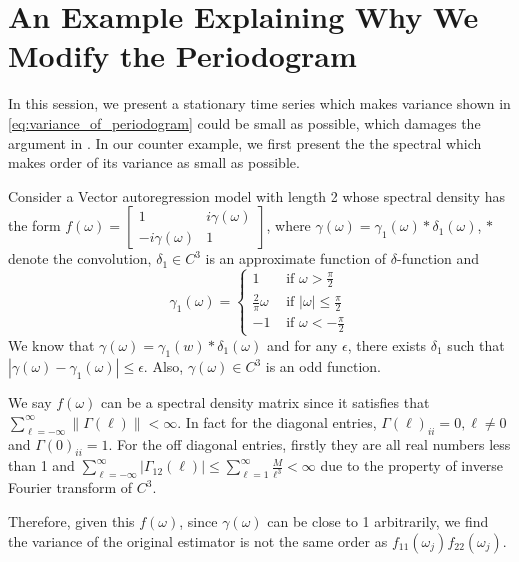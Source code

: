 \section{An Example Explaining Why We Modify the Periodogram}
\label{sec:counter_example}
In this session, we present a stationary time series which makes variance shown in \eqref{eq:variance_of_periodogram} could be small as possible, which damages the argument in \cite{cai2011adaptive}. In our counter example, we first present the the spectral which makes order of its variance as small as possible. 


Consider a Vector autoregression   model with length 2 whose spectral density has the form
$f(\omega)=\begin{bmatrix}1&i\gamma(\omega)\\ -i\gamma(\omega)&1 \end{bmatrix}$, where $\gamma(\omega)=\gamma_1(\omega)*\delta_1(\omega)$, $*$ denote the convolution, $\delta_1\in C^3$ is an approximate function of $\delta$-function and  $$\gamma_1(\omega)= \begin{cases}
1 & \mbox{ if } \omega >\frac{\pi}{2}\\
\frac{2}{\pi}\omega & \mbox{ if } |\omega| \leq \frac{\pi}{2} \\
-1& \mbox{ if } \omega <-\frac{\pi}{2}
\end{cases}
$$ 
We know that $\gamma(\omega)=\gamma_1(w)*\delta_1(\omega)$ and for any $\epsilon$, there exists $\delta_1$ such that $|\gamma(\omega)-\gamma_1(\omega)|\leq \epsilon$.
Also, $\gamma (\omega)\in C^3$ is an odd function.  

We say $f(\omega)$ can be a spectral density matrix since it satisfies 
that  $\sum_{\ell=-\infty}^\infty \|\Gamma(\ell)\|<\infty$. In fact for the diagonal entries, $\Gamma(\ell)_{ii}=0,\ell \neq 0$ and  $\Gamma(0)_{ii}=1$. For the off diagonal entries, firstly they are all real numbers less than 1 and $\sum_{\ell=-\infty}^\infty |\Gamma_{12}(\ell)|\leq \sum_{\ell=1}^\infty \frac{M}{\ell^3}<\infty$ due to the property of inverse Fourier transform of $C^3$.\par
Therefore, given this $f(\omega)$, since $\gamma(\omega)$ can be close to 1 arbitrarily, we find the variance of the original estimator is not the same order as $f_{11}(\omega_j)f_{22}(\omega_j)$.